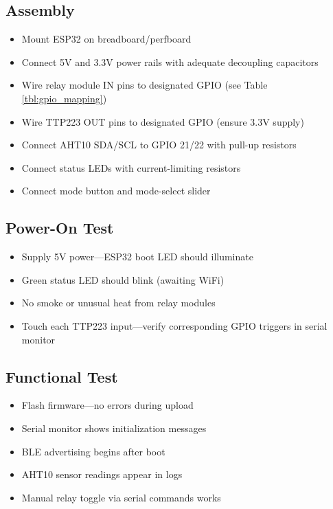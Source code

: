 \subsection{Assembly}

\begin{itemize}
    \item [ ] Mount ESP32 on breadboard/perfboard
    \item [ ] Connect 5V and 3.3V power rails with adequate decoupling capacitors
    \item [ ] Wire relay module IN pins to designated GPIO (see Table \ref{tbl:gpio_mapping})
    \item [ ] Wire TTP223 OUT pins to designated GPIO (ensure 3.3V supply)
    \item [ ] Connect AHT10 SDA/SCL to GPIO 21/22 with pull-up resistors
    \item [ ] Connect status LEDs with current-limiting resistors
    \item [ ] Connect mode button and mode-select slider
\end{itemize}

\subsection{Power-On Test}

\begin{itemize}
    \item [ ] Supply 5V power—ESP32 boot LED should illuminate
    \item [ ] Green status LED should blink (awaiting WiFi)
    \item [ ] No smoke or unusual heat from relay modules
    \item [ ] Touch each TTP223 input—verify corresponding GPIO triggers in serial monitor
\end{itemize}

\subsection{Functional Test}

\begin{itemize}
    \item [ ] Flash firmware—no errors during upload
    \item [ ] Serial monitor shows initialization messages
    \item [ ] BLE advertising begins after boot
    \item [ ] AHT10 sensor readings appear in logs
    \item [ ] Manual relay toggle via serial commands works
\end{itemize}

